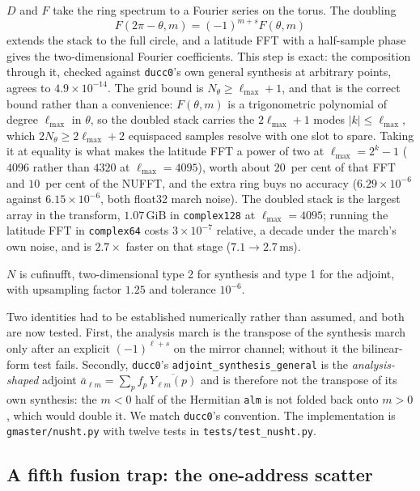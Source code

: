 \documentclass[usenatbib,useAMS]{mnras}
\begin{document}
$D$ and $F$ take the ring spectrum to a Fourier series on the torus. The doubling
\begin{equation}
\label{eq:double}
  F(2\pi-\theta,m)=(-1)^{m+s}F(\theta,m)
\end{equation}
extends the stack to the full circle, and a latitude FFT with a half-sample phase gives the two-dimensional Fourier coefficients. This step is exact: the composition through it, checked against \texttt{ducc0}'s own general synthesis at arbitrary points, agrees to $4.9\times10^{-14}$. The grid bound is $N_\theta\ge\ell_{\max}+1$, and that is the correct bound rather than a convenience: $F(\theta,m)$ is a trigonometric polynomial of degree $\ell_{\max}$ in $\theta$, so the doubled stack carries the $2\ell_{\max}+1$ modes $\lvert k\rvert\le\ell_{\max}$, which $2N_\theta\ge2\ell_{\max}+2$ equispaced samples resolve with one slot to spare. Taking it at equality is what makes the latitude FFT a power of two at $\ell_{\max}=2^k-1$ ($4096$ rather than $4320$ at $\ell_{\max}=4095$), worth about $20$~per cent of that FFT and $10$~per cent of the NUFFT, and the extra ring buys no accuracy ($6.29\times10^{-6}$ against $6.15\times10^{-6}$, both float32 march noise). The doubled stack is the largest array in the transform, $1.07\,\mathrm{GiB}$ in \texttt{complex128} at $\ell_{\max}=4095$; running the latitude FFT in \texttt{complex64} costs $3\times10^{-7}$ relative, a decade under the march's own noise, and is $2.7\times$ faster on that stage ($7.1\to2.7\,\mathrm{ms}$).

$N$ is cufinufft, two-dimensional type 2 for synthesis and type 1 for the adjoint, with upsampling factor $1.25$ and tolerance $10^{-6}$.

Two identities had to be established numerically rather than assumed, and both are now tested. First, the analysis march is the transpose of the synthesis march only after an explicit $(-1)^{\ell+s}$ on the mirror channel; without it the bilinear-form test fails. Secondly, \texttt{ducc0}'s \texttt{adjoint\_synthesis\_general} is the \emph{analysis-shaped} adjoint $\bar a_{\ell m}=\sum_p f_p\,\overline{Y_{\ell m}(p)}$ and is therefore not the transpose of its own synthesis: the $m<0$ half of the Hermitian \texttt{alm} is not folded back onto $m>0$, which would double it. We match \texttt{ducc0}'s convention. The implementation is \texttt{gmaster/nusht.py} with twelve tests in \texttt{tests/test\_nusht.py}.

\subsection{A fifth fusion trap: the one-address scatter}
\label{sec:scatter}
\end{document}

